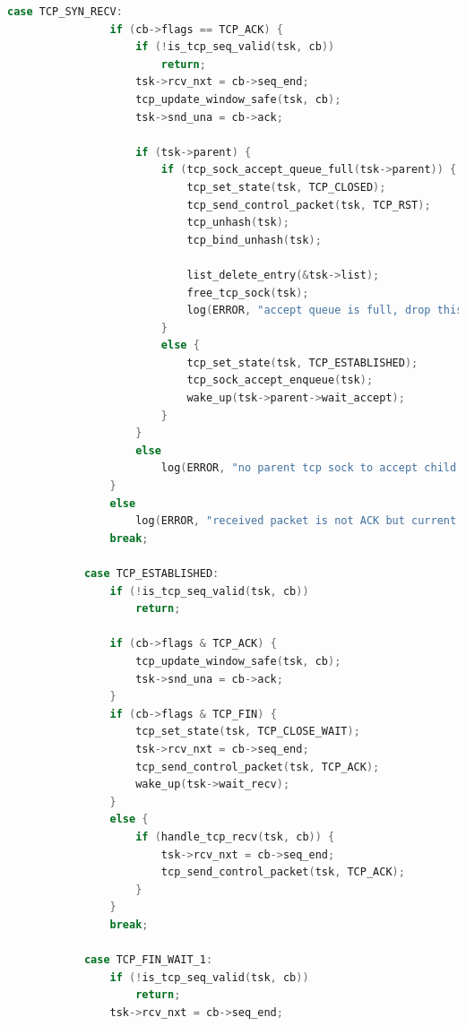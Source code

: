 \documentclass[UTF8]{report}
\begin{document}
\begin{lstlisting}[language=C]
            case TCP_SYN_RECV:
                if (cb->flags == TCP_ACK) {
                    if (!is_tcp_seq_valid(tsk, cb))
                        return;
                    tsk->rcv_nxt = cb->seq_end;
                    tcp_update_window_safe(tsk, cb);
                    tsk->snd_una = cb->ack;
    
                    if (tsk->parent) {
                        if (tcp_sock_accept_queue_full(tsk->parent)) {
                            tcp_set_state(tsk, TCP_CLOSED);
                            tcp_send_control_packet(tsk, TCP_RST);
                            tcp_unhash(tsk);
                            tcp_bind_unhash(tsk);
    
                            list_delete_entry(&tsk->list);
                            free_tcp_sock(tsk);
                            log(ERROR, "accept queue is full, drop this connection.");
                        } 
                        else {
                            tcp_set_state(tsk, TCP_ESTABLISHED);
                            tcp_sock_accept_enqueue(tsk);
                            wake_up(tsk->parent->wait_accept);
                        }
                    }
                    else
                        log(ERROR, "no parent tcp sock to accept child connection.");
                }
                else
                    log(ERROR, "received packet is not ACK but current state is SYN_RECV, drop it.");
                break;
    
            case TCP_ESTABLISHED:
                if (!is_tcp_seq_valid(tsk, cb))
                    return;
    
                if (cb->flags & TCP_ACK) {
                    tcp_update_window_safe(tsk, cb);
                    tsk->snd_una = cb->ack;
                }
                if (cb->flags & TCP_FIN) {
                    tcp_set_state(tsk, TCP_CLOSE_WAIT);
                    tsk->rcv_nxt = cb->seq_end;
                    tcp_send_control_packet(tsk, TCP_ACK);
                    wake_up(tsk->wait_recv);
                }
                else {
                    if (handle_tcp_recv(tsk, cb)) {
                        tsk->rcv_nxt = cb->seq_end;
                        tcp_send_control_packet(tsk, TCP_ACK);
                    }
                }
                break;
            
            case TCP_FIN_WAIT_1:
                if (!is_tcp_seq_valid(tsk, cb))
                    return;
                tsk->rcv_nxt = cb->seq_end;
    

\end{lstlisting}
\end{document}
